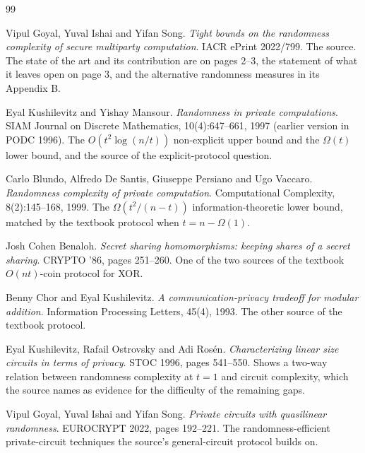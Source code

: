\documentclass{aicr-conjecture}
\newcommand{\Om}{\Omega}
\begin{document}
\begin{aicrbibliography}{99}

Vipul Goyal, Yuval Ishai and Yifan Song.
\emph{Tight bounds on the randomness complexity of secure multiparty
computation}.
IACR ePrint 2022/799.
The source. The state of the art and its contribution are on pages 2--3,
the statement of what it leaves open on page 3, and the alternative
randomness measures in its Appendix B.

Eyal Kushilevitz and Yishay Mansour.
\emph{Randomness in private computations}.
SIAM Journal on Discrete Mathematics, 10(4):647--661, 1997 (earlier
version in PODC 1996).
The $O(t^{2}\log(n/t))$ non-explicit upper bound and the $\Om(t)$ lower
bound, and the source of the explicit-protocol question.

Carlo Blundo, Alfredo De Santis, Giuseppe Persiano and Ugo Vaccaro.
\emph{Randomness complexity of private computation}.
Computational Complexity, 8(2):145--168, 1999.
The $\Om(t^{2}/(n-t))$ information-theoretic lower bound, matched by the
textbook protocol when $t = n - \Om(1)$.

Josh Cohen Benaloh.
\emph{Secret sharing homomorphisms: keeping shares of a secret sharing}.
CRYPTO '86, pages 251--260.
One of the two sources of the textbook $O(nt)$-coin protocol for XOR\@.

Benny Chor and Eyal Kushilevitz.
\emph{A communication-privacy tradeoff for modular addition}.
Information Processing Letters, 45(4), 1993.
The other source of the textbook protocol.

Eyal Kushilevitz, Rafail Ostrovsky and Adi Ros\'en.
\emph{Characterizing linear size circuits in terms of privacy}.
STOC 1996, pages 541--550.
Shows a two-way relation between randomness complexity at $t=1$ and
circuit complexity, which the source names as evidence for the
difficulty of the remaining gaps.

Vipul Goyal, Yuval Ishai and Yifan Song.
\emph{Private circuits with quasilinear randomness}.
EUROCRYPT 2022, pages 192--221.
The randomness-efficient private-circuit techniques the source's
general-circuit protocol builds on.

\end{aicrbibliography}
\end{document}

